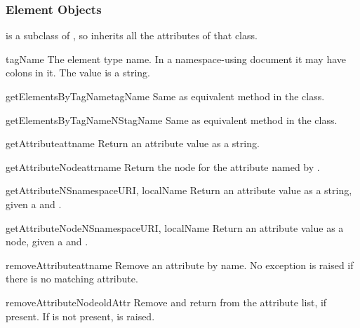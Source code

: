 \subsubsection{Element Objects \label{dom-element-objects}}

 is a subclass of , so inherits all the
attributes of that class.

\begin{memberdesc}[Element]{tagName}
The element type name.  In a namespace-using document it may have
colons in it.  The value is a string.
\end{memberdesc}

\begin{methoddesc}[Element]{getElementsByTagName}{tagName}
Same as equivalent method in the  class.
\end{methoddesc}

\begin{methoddesc}[Element]{getElementsByTagNameNS}{tagName}
Same as equivalent method in the  class.
\end{methoddesc}

\begin{methoddesc}[Element]{getAttribute}{attname}
Return an attribute value as a string.
\end{methoddesc}

\begin{methoddesc}[Element]{getAttributeNode}{attrname}
Return the  node for the attribute named by
.
\end{methoddesc}

\begin{methoddesc}[Element]{getAttributeNS}{namespaceURI, localName}
Return an attribute value as a string, given a  and
.
\end{methoddesc}

\begin{methoddesc}[Element]{getAttributeNodeNS}{namespaceURI, localName}
Return an attribute value as a node, given a  and
.
\end{methoddesc}

\begin{methoddesc}[Element]{removeAttribute}{attname}
Remove an attribute by name.  No exception is raised if there is no
matching attribute.
\end{methoddesc}

\begin{methoddesc}[Element]{removeAttributeNode}{oldAttr}
Remove and return  from the attribute list, if present.
If  is not present,  is raised.
\end{methoddesc}


